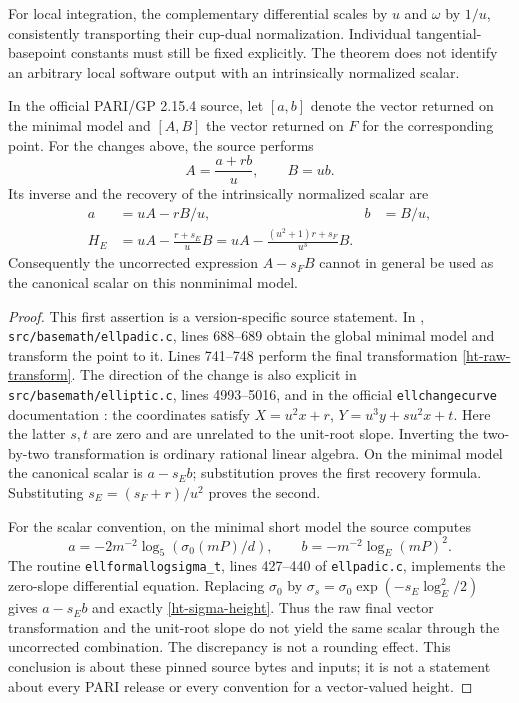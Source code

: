 For local integration, the complementary differential scales by \(u\)
and \(\omega\) by \(1/u\), consistently transporting their cup-dual
normalization. Individual tangential-basepoint constants must still be
fixed explicitly. The theorem does not identify an arbitrary local
software output with an intrinsically normalized scalar.

\begin{proposition}
\label{ht-pari-inverse}
In the official PARI/GP 2.15.4 source, let \([a,b]\) denote the vector
returned on the minimal model and \([A,B]\) the vector returned on
\(F\) for the corresponding point. For the changes above, the source
performs
\begin{equation}
 A=\frac{a+rb}{u},\qquad B=ub.
 \label{ht-raw-transform}
\end{equation}
Its inverse and the recovery of the intrinsically normalized scalar are
\begin{align}
 a&=uA-rB/u,& b&=B/u,\\
 H_E&=uA-\frac{r+s_E}{u}B
     =uA-\frac{(u^2+1)r+s_F}{u^3}B.
 \label{ht-recovered-scalar}
\end{align}
Consequently the uncorrected expression \(A-s_FB\) cannot in general
be used as the canonical scalar on this nonminimal model.
\end{proposition}
\begin{proof}
This first assertion is a version-specific source statement.
In \cite{PARIHeightSource2154},
\texttt{src/\allowbreak basemath/\allowbreak ellpadic.c},
lines 688--689 obtain the global
minimal model and transform the point to it. Lines 741--748 perform
the final transformation \eqref{ht-raw-transform}.
The direction of the change is also explicit in
\texttt{src/\allowbreak basemath/\allowbreak elliptic.c},
lines 4993--5016, and in the official
\texttt{ellchangecurve} documentation \cite{PARIEllipticHeights}:
the coordinates satisfy \(X=u^2x+r\),
\(Y=u^3y+su^2x+t\). Here the latter \(s,t\) are zero and are
unrelated to the unit-root slope.
Inverting the two-by-two transformation is ordinary rational linear
algebra. On the minimal model the canonical scalar is \(a-s_Eb\);
substitution proves the first recovery formula. Substituting
\(s_E=(s_F+r)/u^2\) proves the second.

For the scalar convention, on the minimal short model the source
computes
\[
 a=-2m^{-2}\log_5(\sigma_0(mP)/d),\qquad
 b=-m^{-2}\log_E(mP)^2.
\]
The routine \texttt{ellformallogsigma\_t}, lines 427--440 of
\texttt{ellpadic.c}, implements the zero-slope differential equation.
Replacing \(\sigma_0\) by
\(\sigma_s=\sigma_0\exp(-s_E\log_E^2/2)\) gives \(a-s_Eb\)
and exactly \eqref{ht-sigma-height}.
Thus the raw final vector transformation and the unit-root slope
do not yield the same scalar through the uncorrected combination.
The discrepancy is not a rounding effect. This conclusion is about
these pinned source bytes and inputs; it is not a statement about
every PARI release or every convention for a vector-valued height.
\end{proof}

